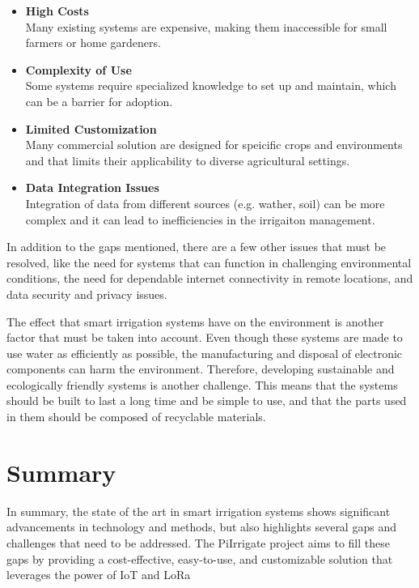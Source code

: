\begin{itemize}
  \item \textbf{High Costs} \\
  Many existing systems are expensive, making them inaccessible for small farmers or home gardeners.
  
  \item \textbf{Complexity of Use} \\
  Some systems require specialized knowledge to set up and maintain, which can be a barrier for adoption.

  \item \textbf{Limited Customization} \\
  Many commercial solution are designed for speicific crops and environments and that limits their
  applicability to diverse agricultural settings.
  \item \textbf{Data Integration Issues} \\
  Integration of data from different sources (e.g. wather, soil) can be more 
  complex and it can lead to inefficiencies in the irrigaiton management.
\end{itemize}

In addition to the gaps mentioned, there are a few other issues that must be resolved, 
like the need for systems that can function in challenging environmental conditions, 
the need for dependable internet connectivity in remote locations, and data security and privacy issues. 

The effect that smart irrigation systems have on the environment is another factor that must be 
taken into account.
Even though these systems are made to use water as efficiently as possible, the manufacturing 
and disposal of electronic components can harm the environment.
Therefore, developing sustainable and ecologically friendly systems is another challenge. 
This means that the systems should be built to last a long time and be simple to use, 
and that the parts used in them should be composed of recyclable materials.

\section{Summary}
In summary, the state of the art in smart irrigation systems shows significant 
advancements in technology and methods, but also highlights several gaps and challenges 
that need to be addressed. The PiIrrigate project aims to fill these gaps by providing a
cost-effective, easy-to-use, and customizable solution that leverages the power of IoT and LoRa 